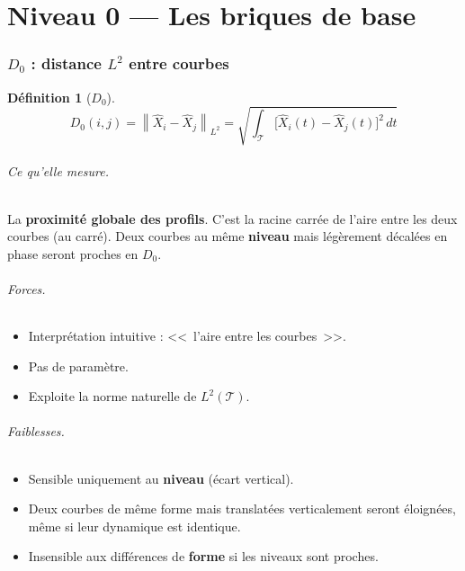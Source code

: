 \documentclass[11pt, a4paper]{article}
\newcommand{\Ltwo}{L^2(\mathcal{T})}
\theoremstyle{definition}
\newtheorem{definition}{Définition}[section]
\theoremstyle{remark}
\begin{document}
\newpage
\part{Niveau 0 — Les briques de base}

\section{$D_0$ : distance $L^2$ entre courbes}

\begin{definition}[$D_0$]
\[
  D_0(i,j) = \left\| \hat{X}_i - \hat{X}_j \right\|_{L^2}
  = \sqrt{\int_{\mathcal{T}} \bigl[\hat{X}_i(t) - \hat{X}_j(t)\bigr]^2 \, dt}
\]
\end{definition}

\paragraph{Ce qu'elle mesure.}
La \textbf{proximité globale des profils}. C'est la racine carrée de l'aire
entre les deux courbes (au carré). Deux courbes au même \textbf{niveau}
mais légèrement décalées en phase seront proches en $D_0$.

\paragraph{Forces.}
\begin{itemize}[nosep]
  \item Interprétation intuitive : <<~l'aire entre les courbes~>>.
  \item Pas de paramètre.
  \item Exploite la norme naturelle de $\Ltwo$.
\end{itemize}

\paragraph{Faiblesses.}
\begin{itemize}[nosep]
  \item Sensible uniquement au \textbf{niveau} (écart vertical).
  \item Deux courbes de même forme mais translatées verticalement seront
    éloignées, même si leur dynamique est identique.
  \item Insensible aux différences de \textbf{forme} si les niveaux sont
    proches.
\end{itemize}
\end{document}
